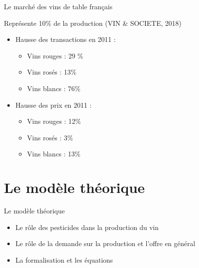\documentclass[11pt,ignorenonframetext,]{beamer}
\providecommand{\tightlist}{%
  \setlength{\itemsep}{0pt}\setlength{\parskip}{0pt}}
\begin{document}
\begin{frame}{Le marché des vins de table français}
\protect\hypertarget{le-marche-des-vins-de-table-francais}{}

Représente 10\% de la production (VIN \& SOCIETE, 2018)

\begin{itemize}
\tightlist
\item
  Hausse des transactions en 2011 :

  \begin{itemize}
  \tightlist
  \item
    Vins rouges : 29 \%
  \item
    Vins rosés : 13\%
  \item
    Vins blancs : 76\%
  \end{itemize}
\item
  Hausse des prix en 2011 :

  \begin{itemize}
  \tightlist
  \item
    Vins rouges : 12\%
  \item
    Vins rosés : 3\%
  \item
    Vins blancs : 13\%
  \end{itemize}
\end{itemize}

\end{frame}

\hypertarget{le-modele-theorique}{%
\section{Le modèle théorique}\label{le-modele-theorique}}

\begin{frame}{Le modèle théorique}
\protect\hypertarget{le-modele-theorique-1}{}

\begin{itemize}
\tightlist
\item
  Le rôle des pesticides dans la production du vin
\item
  Le rôle de la demande sur la production et l'offre en général
\item
  La formalisation et les équations
\end{itemize}

\end{frame}
\end{document}
